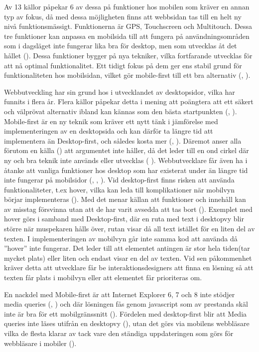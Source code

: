 \documentclass[11pt]{article}
\begin{document}
Av 13 källor påpekar 6 av dessa på funktioner hos mobilen som kräver en annan typ av fokus, då med dessa möjligheten finns att webbsidan tas till en helt ny nivå funktionsmässigt. Funktionerna är GPS, Touchscreen och Multitouch. Dessa tre funktioner kan anpassa en mobilsida till att fungera på användningsområden som i dagsläget inte fungerar lika bra för desktop, men som utvecklas åt det hållet (\cite{sweclock}). Dessa funktioner bygger på nya tekniker, vilka fortfarande utvecklas för att nå optimal funktionalitet. Ett tidigt fokus på dem ger ens stabil grund för funktionaliteten hos mobilsidan, vilket gör mobile-first till ett bra alternativ (\cite{techradar}, \cite{othermedia}).
 
Webbutveckling har sin grund hos i utvecklandet av desktopsidor, vilka har funnits i flera år. Flera källor påpekar detta i mening att poängtera att ett säkert och välprövat alternativ ibland kan kännas som den bästa startpunkten (\cite{armstrong}, \cite{readyartwork}). Mobile-first är en ny teknik som kräver ett nytt tänk i jämförelse med implementeringen av en desktopsida och kan därför ta längre tid att implementera än Desktop-first, och således kosta mer (\cite{readyartwork}, \cite{marcuspope}). Däremot anser alla förutom en källa (\cite{armstrong}) att argumentet inte håller, då det leder till en ond cirkel där ny och bra teknik inte används eller utvecklas (\cite{designshack} \cite{marcuspope}). Webbutvecklare får även ha i åtanke att vanliga funktioner hos desktop som har existerat under än längre tid inte fungerar på mobilsidor (\cite{responsivedesign}, \cite{designshack}, \cite{webinsation}). Vid desktop-first finns risken att använda funktionaliteter, t.ex hover, vilka kan leda till komplikationer när mobilvyn börjar implementeras (\cite{readyartwork}). Med det menar källan att funktioner och innehåll kan av misstag försvinna utan att de har varit avsedda att tas bort (\cite{readyartwork}). Exemplet med hover görs i samband med Desktop-first, där en ruta med text i desktopvy blir större när muspekaren hålls över, rutan visar då all text istället för en liten del av texten. I implementeringen av mobilvyn går inte samma kod att använda då ”hover” inte fungerar. Det leder till att elementet antingen är stor hela tiden(tar mycket plats) eller liten och endast visar en del av texten. Vid sen påkommenhet kräver detta att utvecklare får be interaktionsdesigners att finna en lösning så att texten får plats i mobilvyn eller att elementet får prioriteras om.
 
En nackdel med Mobile-first är att Internet Explorer 6, 7 och 8 inte stödjer media queries (\cite{marcuspope}, \cite{neocreo}) och där lösningen fås genom javascript som av prestanda skäl inte är bra för ett mobilgränssnitt (\cite{responsivedesign}). Fördelen med desktop-first blir att Media queries inte läses utifrån en desktopvy (\cite{neocreo}), utan det görs via mobilens webbläsare vilka de flesta klarar av tack vare den ständiga uppdateringen som görs för webbläsare i mobiler (\cite{webinsation}).
 
\end{document}
